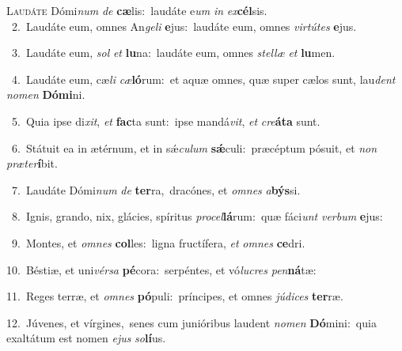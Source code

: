 \lettrine{\initial\textcolor{\initialcolor}{L}}{audáte} Dómi\textit{num} \textit{de} \textbf{cæ}\-lis:~\star laudáte e\textit{um} \textit{in} \textit{ex}\-\textbf{cél}sis.\\
{\numbfont\textcolor{\numbcolor}{~2.}}~Laudáte eum, omnes An\-\textit{ge}\-\textit{li} \textbf{e}\-jus:~\star laudáte eum, omnes \textit{vir}\-\textit{tú}\textit{tes} \textbf{e}\-jus.\par
{\numbfont\textcolor{\numbcolor}{~3.}}~Laudáte eum, \textit{sol} \textit{et} \textbf{lu}\-na:~\star laudáte eum, omnes \textit{stel}\-\textit{læ} \textit{et} \textbf{lu}\-men.\par
{\numbfont\textcolor{\numbcolor}{~4.}}~Laudáte eum, cæ\textit{li} \textit{cæ}\-\textbf{ló}rum:~\star et aquæ omnes, quæ super cælos sunt, lau\textit{dent} \textit{no}\-\textit{men} \textbf{Dó}\-\textbf{mi}ni.\par
{\numbfont\textcolor{\numbcolor}{~5.}}~Quia ipse di\-\textit{xit}\-, \textit{et} \textbf{fac}\-ta sunt:~\star ipse mandá\-\textit{vit}\-, \textit{et} \textit{cre}\-\textbf{á}\textbf{ta} sunt.\par
{\numbfont\textcolor{\numbcolor}{~6.}}~Státuit ea in ætérnum, et in sǽ\-\textit{cu}\-\textit{lum} \textbf{sǽ}\-culi:~\star præcéptum pósuit, et \textit{non} \textit{præ}\-\textit{ter}\textbf{í}bit.\par
{\numbfont\textcolor{\numbcolor}{~7.}}~Laudáte Dómi\textit{num} \textit{de} \textbf{ter}\-ra,~\star dracónes, et \textit{om}\-\textit{nes} \textit{a}\-\textbf{býs}si.\par
{\numbfont\textcolor{\numbcolor}{~8.}}~Ignis, grando, nix, glácies, spíritus \textit{pro}\-\textit{cel}\textbf{lá}rum:~\star quæ fáci\textit{unt} \textit{ver}\-\textit{bum} \textbf{e}\-jus:\par
{\numbfont\textcolor{\numbcolor}{~9.}}~Montes, et \textit{om}\-\textit{nes} \textbf{col}\-les:~\star ligna fructífera, \textit{et} \textit{om}\-\textit{nes} \textbf{ce}\-dri.\par
{\numbfont\textcolor{\numbcolor}{10.}}~Béstiæ, et uni\-\textit{vér}\-\textit{sa} \textbf{pé}\-cora:~\star serpéntes, et vó\-\textit{lu}\-\textit{cres} \textit{pen}\-\textbf{ná}tæ:\par
{\numbfont\textcolor{\numbcolor}{11.}}~Reges terræ, et \textit{om}\-\textit{nes} \textbf{pó}\-puli:~\star príncipes, et omnes \textit{jú}\-\textit{di}\textit{ces} \textbf{ter}\-ræ.\par
{\numbfont\textcolor{\numbcolor}{12.}}~Júvenes, et vírgines,~\dagger senes cum junióribus laudent \textit{no}\-\textit{men} \textbf{Dó}\-mini:~\star quia exaltátum est nomen \textit{e}\-\textit{jus} \textit{so}\-\textbf{lí}us.\par
